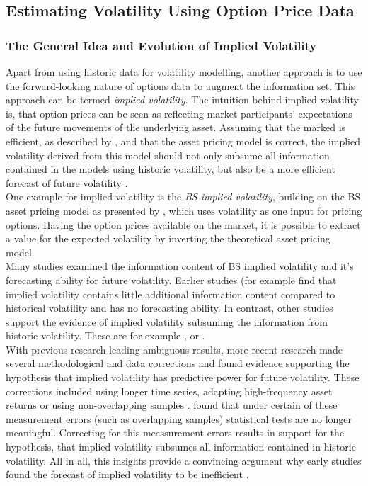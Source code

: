 \subsection{Estimating Volatility Using Option Price Data}
\subsubsection{The General Idea and Evolution of Implied Volatility}
Apart from using historic data for volatility modelling, another approach is to use the forward-looking nature of options data to augment the information set. This approach can be termed \emph{implied volatility}. The intuition behind implied volatility is, that option prices can be seen as reflecting market participants' expectations of the future movements of the underlying asset. Assuming that the marked is efficient, as described by \textcite{fama1970}, and that the asset pricing model is correct, the implied volatility derived from this model should not only subsume all information contained in the models using historic volatility, but also be a more efficient forecast of future volatility \parencite{jiang2003}. \\
One example for implied volatility is the \emph{\ac{BS} implied volatility}, building on the \ac{BS} asset pricing model as presented by \textcite{black1973}, which uses volatility as one input for pricing options. Having the option prices available on the market, it is possible to extract a value for the expected volatility by inverting the theoretical asset pricing model. \\
Many studies examined the information content of \ac{BS} implied volatility and it's forecasting ability for future volatility. Earlier studies (for example \textcite{canina1993} find that implied volatility contains little additional information content compared to historical volatility and has no forecasting ability. In contrast, other studies  support the evidence of implied volatility subsuming the information from historic volatility. These are for example \textcite{day1992}, \textcite{lamoureux1993} or \textcite{jorion1995}.\\
With previous research leading ambiguous results, more recent research made several methodological and data corrections and found evidence supporting the hypothesis that implied volatility has predictive power for future volatility. These corrections included using longer time series, adapting high-frequency asset returns or using non-overlapping samples \parencite{jiang2003}. \textcite{christensen2001} found that under certain of these measurement errors (such as overlapping samples) statistical tests are no longer meaningful. Correcting for this meassurement errors results in support for the hypothesis, that implied volatility subsumes all information contained in historic volatility. All in all, this insights provide a convincing argument why early studies found the forecast of implied volatility to be inefficient \parencite{jiang2003}. \\
